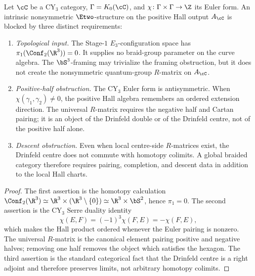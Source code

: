 \begin{proposition}
\label{prop:three-component-obstruction}
Let \(\cC\) be a CY$_3$ category, \(\Gamma=K_0(\cC)\), and
\(\chi\colon \Gamma\times\Gamma\to \Z\) its Euler form. An intrinsic
nonsymmetric \(\Etwo\)-structure on the positive Hall output \(A_\cC\)
is blocked by three distinct requirements:
\begin{enumerate}[label=(\roman*)]
 \item \emph{Topological input.} The Stage-$1$ \(E_3\)-configuration
 space has \(\pi_1(\Conf_2(\R^3))=0\). It supplies no braid-group
 parameter on the curve algebra. The \(\bS^3\)-framing may trivialize
 the framing obstruction, but it does not create the nonsymmetric
 quantum-group \(R\)-matrix on \(A_\cC\).
 \item \emph{Positive-half obstruction.} The CY$_3$ Euler form is
 antisymmetric. When \(\chi(\gamma_1,\gamma_2)\neq 0\), the positive Hall
 algebra remembers an ordered extension direction. The universal
 \(R\)-matrix requires the negative half and Cartan pairing; it is an
 object of the Drinfeld double or of the Drinfeld centre, not of the
 positive half alone.
 \item \emph{Descent obstruction.} Even when local centre-side
 \(R\)-matrices exist, the Drinfeld centre does not commute with
 homotopy colimits. A global braided category therefore requires
 pairing, completion, and descent data in addition to the local Hall
 charts.
\end{enumerate}
\end{proposition}

\begin{proof}
The first assertion is the homotopy calculation
\(\Conf_2(\R^3)\simeq \R^3\times(\R^3\setminus\{0\})\simeq \R^3\times
\bS^2\), hence \(\pi_1=0\). The second assertion is the CY$_3$ Serre
duality identity
\[
 \chi(E,F)=(-1)^3\chi(F,E)=-\chi(F,E),
\]
which makes the Hall product ordered whenever the Euler pairing is
nonzero. The universal \(R\)-matrix is the canonical element pairing
positive and negative halves; removing one half removes the object which
satisfies the hexagon. The third assertion is the standard categorical
fact that the Drinfeld centre is a right adjoint and therefore preserves
limits, not arbitrary homotopy colimits.
\end{proof}

